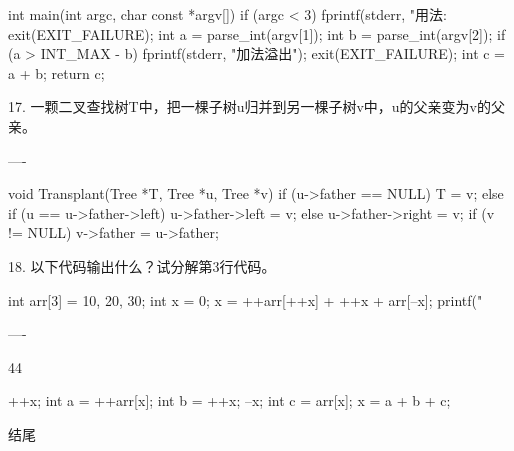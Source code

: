   int main(int argc, char const *argv[]) {
      if (argc < 3) {
          fprintf(stderr, "用法: %
          exit(EXIT_FAILURE);
      }
      int a = parse_int(argv[1]);
      int b = parse_int(argv[2]);
      if (a > INT_MAX - b) {
          fprintf(stderr, "加法溢出\n");
          exit(EXIT_FAILURE);
      }
      int c = a + b;
      return c;
  }

17. 一颗二叉查找树T中，把一棵子树u归并到另一棵子树v中，u的父亲变为v的父亲。

----

    void Transplant(Tree *T, Tree *u, Tree *v) {
        if (u->father == NULL) {
            T = v;
        } else if (u == u->father->left) {
            u->father->left = v;
        } else {
            u->father->right = v;
        }
        if (v != NULL) {
            v->father = u->father;
        }
    }

18. 以下代码输出什么？试分解第3行代码。

    int arr[3] = {10, 20, 30};
    int x = 0;
    x = ++arr[++x] + ++x + arr[--x];
    printf("%

----

    44

    ++x;
    int a = ++arr[x];
    int b = ++x;
    --x;
    int c = arr[x];
    x = a + b + c;

















结尾
